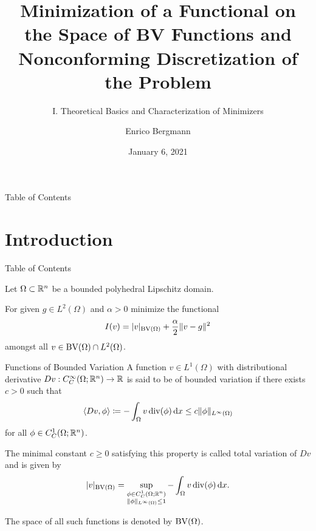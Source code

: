 \documentclass[xcolor=svgnames,english]{beamer}
\author{Enrico Bergmann}
\title{Minimization of a Functional on the Space of BV Functions and 
Nonconforming Discretization of the Problem}
\subtitle{I. Theoretical Basics and Characterization of Minimizers}
\institute{Humboldt-Universität zu Berlin}
\date{January 6, 2021}
\begin{document}
\begin{frame}
	\maketitle
\end{frame}
  
\begin{frame}{Table of Contents}
  \tableofcontents
\end{frame}


\section{Introduction}

\begin{frame}[noframenumbering]{Table of Contents}
\end{frame}

\begin{frame}

  \bigskip
  \pause

  Let $\Omega\subset\mathbb{R}^n$ be a bounded polyhedral Lipschitz domain.

  \medskip

  For given $g\in L^2(\Omega)$ and $\alpha>0$ minimize the functional 
  \begin{align*}
    I(v)=|v|_{\textup{BV}(\Omega)}+\frac{\alpha}{2}\Vert v-g\Vert^2
  \end{align*}
  amongst all $v\in \textup{BV}(\Omega)\cap L^2(\Omega)$.
\end{frame}

\begin{frame}{Functions of Bounded Variation}
  A function $v\in L^1(\Omega)$ with distributional derivative
  $Dv:C^{\infty}_C(\Omega;\mathbb{R}^n)\to\mathbb{R}$ is said to be of bounded variation if 
  there exists $c>0$ such that 
  \begin{align*}
    \langle Dv, \phi\rangle\coloneqq -\int_\Omega v\operatorname{div}(\phi)\,\mathrm{d}x\leq
    c\Vert\phi\Vert_{L^\infty(\Omega)}
  \end{align*}
  for all $\phi\in C^1_C(\Omega;\mathbb{R}^n)$.

  \pause  

  The minimal constant $c\geq 0$ satisfying this property is called 
  total variation of $Dv$ and is given by
  \begin{align*}
    |v|_{\textup{BV}(\Omega)} = \sup_{\substack{\phi\in C^1_C(\Omega;\mathbb{R}^n)\\
    \Vert\phi\Vert_{L^\infty(\Omega)}\leq 1}}-\int_\Omega v\operatorname{div} (\phi)\,\mathrm{d}x.
  \end{align*}

  \pause

  The space of all such functions is denoted by $\textup{BV}(\Omega)$.
\end{frame}
\end{document}
